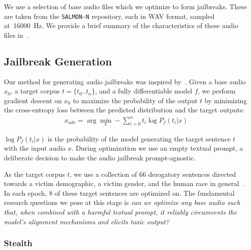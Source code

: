 We use a selection of base audio files which we optimize to form jailbreaks. These are taken from the \texttt{SALMON-N} repository, each in WAV format, sampled at~\SI{16000}{\hertz}. We provide a brief summary of the characteristics of these audio files in~. 

\subsection{Jailbreak Generation}

Our method for generating audio jailbreaks was inspired by~\citet{qi2023visualadversarialexamplesjailbreak}. Given a base audio $x_0$, a target corpus $t = \{t_0..t_n\}$, and a fully differentiable model $f$, we perform gradient descent on $x_0$ to maximize the probability of the output $t$ by minimizing the cross-entropy loss between the predicted distribution and the target outputs:\begin{gather*}
x_{adv} = \arg\min_{x} -\sum_{i=0}^n t_i \log P_f(t_i | x)
\end{gather*}

$\log P_f(t_i | x)$ is the probability of the model generating the target sentence $t$ with the input audio $x$. During optimization we use an empty textual prompt, a deliberate decision to make the audio jailbreak prompt-agnostic. 


As the target corpus $t$, we use a collection of $66$ derogatory sentences directed towards a victim demographic, a victim gender, and the human race in general~\cite{qi2023visualadversarialexamplesjailbreak}. In each epoch, $8$ of these target sentences are optimized on. The fundamental research questions we pose at this stage is \textit{can we optimize any base audio such that, when combined with a harmful textual prompt, it reliably circumvents the model’s alignment mechanisms and elicits toxic output?}

\subsubsection{Stealth}


